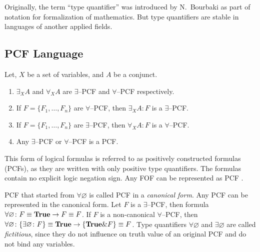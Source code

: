 \documentclass[a4paper,12pt]{article}
\begin{document}
Originally, the term ``type quantifier'' was introduced by N.~Bourbaki \cite{Bourbaki} as part of notation for formalization of mathematics. But type quantifiers are stable in languages of another applied fields.

\subsection{PCF Language}

\begin{definition}
\label{def:pcf}
Let, $X$ be a set of variables, and $A$ be a conjunct.
\begin{enumerate}

\item $\exists_XA$ and $\forall_XA$ are $\exists$--PCF and $\forall$--PCF respectively.

\item If $F = \{F_1,\ldots,F_n\}$ are $\forall$--PCF, then $\exists_XA\colon F$ is a $\exists$--PCF.

\item If $F = \{F_1,\ldots,F_n\}$ are $\exists$--PCF, then $\forall_XA\colon F$ is a $\forall$--PCF.

\item Any $\exists$--PCF or $\forall$--PCF is a PCF.
\end{enumerate}
\end{definition}

This form of logical formulas is referred to as positively constructed formulas (PCFs), as they are written with only positive type quantifiers. The formulas contain no explicit logic negation sign. Any FOF can be represented as PCF \cite{ICDS2000}.

PCF that started from $\forall \varnothing$ is called PCF in a {\em canonical form}. Any PCF can be represented in the canonical form. Let $F$ is a $\exists$--PCF, then formula
$\forall \varnothing\colon F \equiv \text{\textbf{True}} \rightarrow F \equiv F$. If $F$ is a non-canonical $\forall$--PCF, then $\forall \varnothing\colon\{\exists \varnothing\colon F\} \equiv \text{\textbf{True}} \rightarrow \{\text{\textbf{True}}\&F\} \equiv F$. Type quantifiers $\forall \varnothing$ and $\exists \varnothing$ are called {\em fictitious}, since they do not influence on truth value of an original PCF and do not bind any variables.  %
\end{document}
